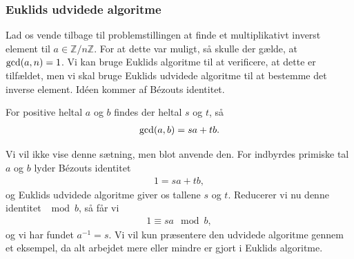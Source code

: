 \documentclass[12pt]{article}
\begin{document}
\subsubsection*{Euklids udvidede algoritme}
Lad os vende tilbage til problemstillingen at finde et multiplikativt inverst element til $a\in \mathbb{Z}/n\mathbb{Z}$. For at dette var muligt, så skulle der gælde, at $\textnormal{gcd}(a,n)=1$. Vi kan bruge Euklids algoritme til at verificere, at dette er tilfældet, men vi skal bruge Euklids udvidede algoritme til at bestemme det inverse element. Idéen kommer af Bézouts identitet.
\begin{setn}
For positive heltal $a$ og $b$ findes der heltal $s$ og $t$, så
\begin{align*}
\textnormal{gcd}(a,b) = sa + tb.
\end{align*}
\end{setn}
Vi vil ikke vise denne sætning, men blot anvende den. For indbyrdes primiske tal $a$ og $b$ lyder Bézouts identitet
\begin{align*}
1 = sa+tb,
\end{align*}
og Euklids udvidede algoritme giver os tallene $s$ og $t$. Reducerer vi nu denne identitet $\mod{b}$, så får vi
\begin{align*}
1 \equiv sa \mod{b},
\end{align*}
og vi har fundet $a^{-1} = s$. Vi vil kun præsentere den udvidede algoritme gennem et eksempel, da alt arbejdet mere eller mindre er gjort i Euklids algoritme.
\end{document}
